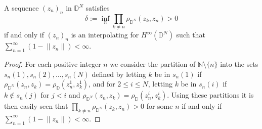 \documentclass[10pt,a4paper]{amsart}
\newcommand{\D}{\mathbb{D}}
\newcommand{\N}{\mathbb{N}}
\begin{document}
\begin{theorem}
    A sequence $(z_n)_n$ in $\D^N$ satisfies 
    \[
    \delta:=\inf_n \prod_{k\neq n}\rho_{\D^N}(z_k,z_n)>0
    \]
    if and only if $(z_n)_n$ is an interpolating for $H^\infty(\D^N)$ such that $\sum_{n=1}^\infty(1-\lVert z_n\rVert)<\infty$.
\end{theorem}

\begin{proof}
For each positive integer $n$ we consider the partition of $\N\setminus\{n\}$ into the sets $s_n(1), s_n(2), \dots, s_n(N)$ defined by letting $k$ be in $s_n(1)$ if $\rho_{\D^N}(z_n,z_k)=\rho_{\D}(z_n^1,z_k^1)$, and for $2\leq i\leq N$, letting $k$ be in $s_n(i)$ if $k\notin s_n(j)$ for $j<i$ and $\rho_{\D^N}(z_n,z_k)=\rho_{\D}(z_n^i,z_k^i)$. Using these partitions it is then easily seen that $\prod_{k\neq n}\rho_{\D^N}(z_k,z_n)>0$ for some $n$ if and only if $\sum_{n=1}^\infty(1-\lVert z_n\rVert)<\infty$. 


\end{proof}
\end{document}
